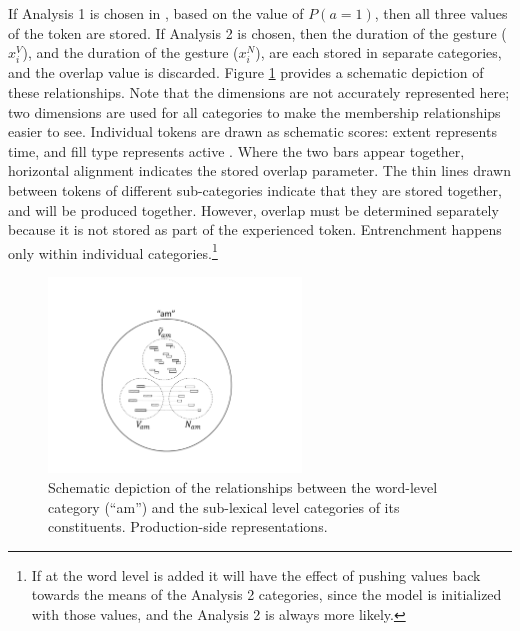 If Analysis 1 is chosen in , based on the value of $P(a=1)$,
then all three values of the token are stored. If Analysis 2 is chosen,
then the duration of the  gesture ($x_{i}^{V}$), and the
duration of the  gesture ($x_{i}^{N}$), are each stored in separate
categories, and the overlap value is discarded. Figure \ref{fig:MultiParse-Reps}
provides a schematic depiction of these relationships. Note that the
dimensions are not accurately represented here; two dimensions are
used for all categories to make the membership relationships easier
to see. Individual tokens are drawn as schematic  scores:
extent represents time, and fill type represents active .
Where the two bars appear together, horizontal alignment indicates the stored  overlap parameter. The thin
lines drawn between tokens of different sub-categories indicate that
they are stored together, and will be produced together. However, overlap must
be determined separately because it is not stored as part of the experienced token. Entrenchment happens only
within individual  categories.\footnote{If  at the word level is added it will have the effect
of pushing values back towards the means of the Analysis 2 categories,
since the model is initialized with those values, and the Analysis 2
 is always more likely.}

\begin{figure}[h]
\includegraphics[width=0.6\textwidth]{figures/MultiParseModel.pdf}\caption{\label{fig:MultiParse-Reps}Schematic depiction of the relationships
between the word-level category (“am”) and the sub-lexical level
categories of its constituents. Production-side representations.}
\end{figure}

